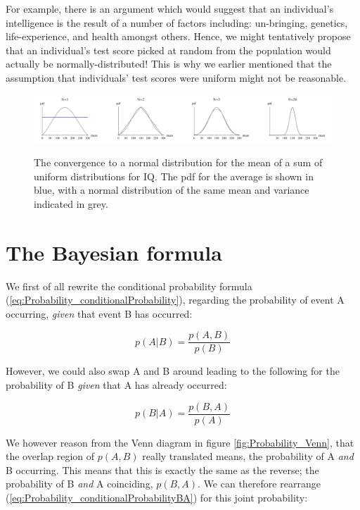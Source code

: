 \documentclass[11pt,fullpage]{book}
\begin{document}
For example, there is an argument which would suggest that an individual's intelligence is the result of a number of factors including: un-bringing, genetics, life-experience, and health amongst others. Hence, we might tentatively propose that an individual's test score picked at random from the population would actually be normally-distributed! This is why we earlier mentioned that the assumption that individuals' test scores were uniform might not be reasonable.

\begin{figure}
\centering
\scalebox{0.4} 
{\includegraphics{Probability_CLTNormalSum.pdf}}
\caption{The convergence to a normal distribution for the mean of a sum of uniform distributions for IQ. The pdf for the average is shown in blue, with a normal distribution of the same mean and variance indicated in grey.}\label{fig:Probability_CLTNormalSum}
\end{figure}

\section{The Bayesian formula}\label{sec:Probability_BayesianFormula}
We first of all rewrite the conditional probability formula (\ref{eq:Probability_conditionalProbability}), regarding the probability of event A occurring, \textit{given} that event B has occurred:

\begin{equation}\label{eq:Probability_conditionalProbabilityAB}
p(A|B) = \frac{p(A,B)}{p(B)}
\end{equation}

However, we could also swap A and B around leading to the following for the probability of B \textit{given} that A has already occurred:

\begin{equation}\label{eq:Probability_conditionalProbabilityBA}
p(B|A) = \frac{p(B,A)}{p(A)}
\end{equation}

We however reason from the Venn diagram in figure \ref{fig:Probability_Venn}, that the overlap region of $p(A,B)$ really translated means, the probability of A \textit{and} B occurring. This means that this is exactly the same as the reverse; the probability of B \textit{and} A coinciding, $p(B,A)$. We can therefore rearrange (\ref{eq:Probability_conditionalProbabilityBA}) for this joint probability:
\end{document}
